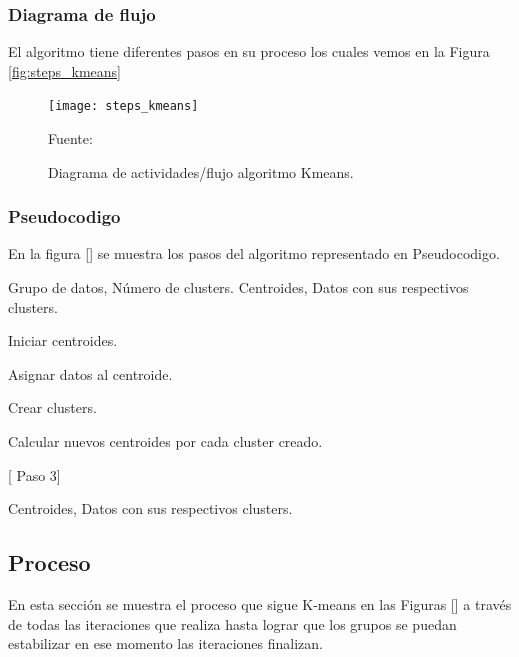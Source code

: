 \subsubsection{Diagrama de flujo}

El algoritmo tiene diferentes pasos en su proceso los cuales vemos en la Figura \ref{fig:steps_kmeans}

\begin{figure}[ht]
	\begin{center}
		\texttt{[image: steps\_kmeans]}
	\end{center}
	\begin{center}
		\vskip -0.5cm
		\caption{\small{Diagrama de actividades/flujo algoritmo Kmeans.}}
		{\small{Fuente: }}
	\end{center}
\end{figure}

\subsubsection{Pseudocodigo}
En la figura [] se muestra los pasos del algoritmo representado en Pseudocodigo.

\begin{algorithm}
\begin{algorithmic}[1]
		\REQUIRE Grupo de datos, Número de clusters.  %
		\label{lin:algorithm_kmeans}
		\ENSURE Centroides, Datos con sus respectivos clusters.                                                       %
		
		\STATE Iniciar centroides.
					
		\STATE Asignar datos al centroide. \label{marker}
			
		\STATE Crear clusters.
			
		\STATE Calcular nuevos centroides por cada cluster creado.
			
			 [ Paso 3]
		\ENDIF
			
		\RETURN  Centroides, Datos con sus respectivos clusters.
		
\end{algorithmic}
\end{algorithm}


\subsection{Proceso}

En esta sección se muestra el proceso que sigue K-means en las Figuras [] a través de todas las iteraciones que realiza hasta lograr que los grupos se puedan estabilizar en ese momento las iteraciones finalizan.


